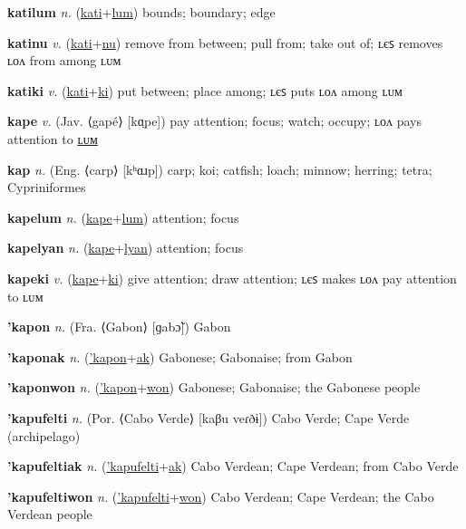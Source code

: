 \textbf{\hypertarget{katilum}{katilum}} \textit{n.} (\hyperlink{kati}{kati}+\allowbreak \hyperlink{lum}{lum})
bounds; boundary; edge

\textbf{\hypertarget{katinu}{katinu}} \textit{v.} (\hyperlink{kati}{kati}+\allowbreak \hyperlink{nu}{nu})
remove from between; pull from; take out of; ʟєꜱ removes ʟᴏᴧ from among ʟᴜᴍ

\textbf{\hypertarget{katiki}{katiki}} \textit{v.} (\hyperlink{kati}{kati}+\allowbreak \hyperlink{ki}{ki})
put between; place among; ʟєꜱ puts ʟᴏᴧ among ʟᴜᴍ

\textbf{\hypertarget{kape}{kape}} \textit{v.} (Jav. ⟨gapé⟩ [kɑ̤pe])
pay attention; focus; watch; occupy; ʟᴏᴧ pays attention to \hyperlink{kapelum}{ʟᴜᴍ}

\textbf{\hypertarget{kap}{kap}} \textit{n.} (Eng. ⟨carp⟩ [kʰɑɹp])
carp; koi; catfish; loach; minnow; herring; tetra; Cypriniformes

\textbf{\hypertarget{kapelum}{kapelum}} \textit{n.} (\hyperlink{kape}{kape}+\allowbreak \hyperlink{lum}{lum})
attention; focus

\textbf{\hypertarget{kapelyan}{kapelyan}} \textit{n.} (\hyperlink{kape}{kape}+\allowbreak \hyperlink{lyan}{lyan})
attention; focus

\textbf{\hypertarget{kapeki}{kapeki}} \textit{v.} (\hyperlink{kape}{kape}+\allowbreak \hyperlink{ki}{ki})
give attention; draw attention; ʟєꜱ makes ʟᴏᴧ pay attention to ʟᴜᴍ

\textbf{\hypertarget{'kapon}{'kapon}} \textit{n.} (Fra. ⟨Gabon⟩ [ɡabɔ̃])
Gabon

\textbf{\hypertarget{'kaponak}{'kaponak}} \textit{n.} (\hyperlink{'kapon}{'kapon}+\allowbreak \hyperlink{ak}{ak})
Gabonese; Gabonaise; from Gabon

\textbf{\hypertarget{'kaponwon}{'kaponwon}} \textit{n.} (\hyperlink{'kapon}{'kapon}+\allowbreak \hyperlink{won}{won})
Gabonese; Gabonaise; the Gabonese people

\textbf{\hypertarget{'kapufelti}{'kapufelti}} \textit{n.} (Por. ⟨Cabo Verde⟩ [kaβu veɾðɨ])
Cabo Verde; Cape Verde (archipelago)

\textbf{\hypertarget{'kapufeltiak}{'kapufeltiak}} \textit{n.} (\hyperlink{'kapufelti}{'kapufelti}+\allowbreak \hyperlink{ak}{ak})
Cabo Verdean; Cape Verdean; from Cabo Verde

\textbf{\hypertarget{'kapufeltiwon}{'kapufeltiwon}} \textit{n.} (\hyperlink{'kapufelti}{'kapufelti}+\allowbreak \hyperlink{won}{won})
Cabo Verdean; Cape Verdean; the Cabo Verdean people

